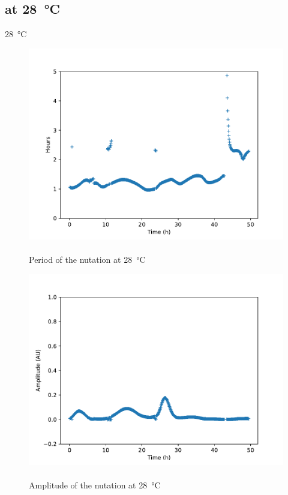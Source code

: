 \documentclass[12pt]{beamer}
\begin{document}
\subsection{at \SI{28}{\celsius}}
\begin{frame}{\SI{28}{\celsius}}
\begin{multicols}{2}
\begin{figure}
\includegraphics[width = \linewidth]{period28.pdf}~\\
Period of the nutation at \SI{28}{\celsius}
\end{figure}
\begin{figure}
\includegraphics[width = \linewidth]{ampl28.pdf}~\\
Amplitude of the nutation at \SI{28}{\celsius}
\end{figure}
\end{multicols}
\end{frame}
\end{document}
